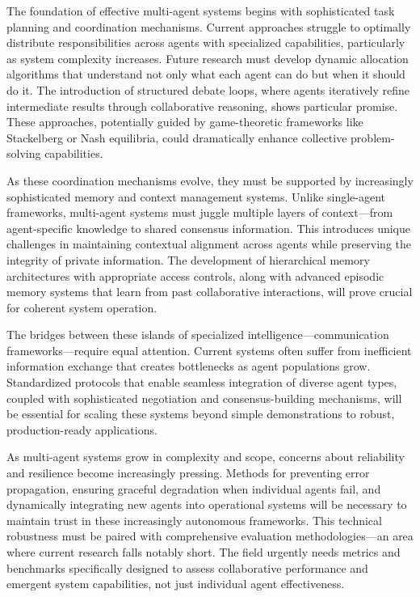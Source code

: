 \documentclass[journal,twoside,10pt]{IEEEtran}
\begin{document}
The foundation of effective multi-agent systems begins with sophisticated task planning and coordination mechanisms. Current approaches struggle to optimally distribute responsibilities across agents with specialized capabilities, particularly as system complexity increases. Future research must develop dynamic allocation algorithms that understand not only what each agent can do but when it should do it. The introduction of structured debate loops, where agents iteratively refine intermediate results through collaborative reasoning, shows particular promise. These approaches, potentially guided by game-theoretic frameworks like Stackelberg or Nash equilibria, could dramatically enhance collective problem-solving capabilities.

As these coordination mechanisms evolve, they must be supported by increasingly sophisticated memory and context management systems. Unlike single-agent frameworks, multi-agent systems must juggle multiple layers of context—from agent-specific knowledge to shared consensus information. This introduces unique challenges in maintaining contextual alignment across agents while preserving the integrity of private information. The development of hierarchical memory architectures with appropriate access controls, along with advanced episodic memory systems that learn from past collaborative interactions, will prove crucial for coherent system operation.

The bridges between these islands of specialized intelligence—communication frameworks—require equal attention. Current systems often suffer from inefficient information exchange that creates bottlenecks as agent populations grow. Standardized protocols that enable seamless integration of diverse agent types, coupled with sophisticated negotiation and consensus-building mechanisms, will be essential for scaling these systems beyond simple demonstrations to robust, production-ready applications.

As multi-agent systems grow in complexity and scope, concerns about reliability and resilience become increasingly pressing. Methods for preventing error propagation, ensuring graceful degradation when individual agents fail, and dynamically integrating new agents into operational systems will be necessary to maintain trust in these increasingly autonomous frameworks. This technical robustness must be paired with comprehensive evaluation methodologies—an area where current research falls notably short. The field urgently needs metrics and benchmarks specifically designed to assess collaborative performance and emergent system capabilities, not just individual agent effectiveness.
\end{document}
